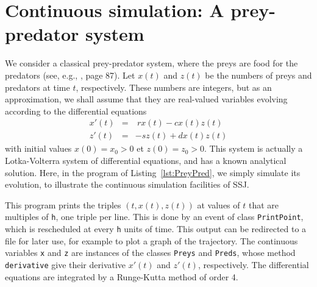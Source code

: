 \section {Continuous simulation: A prey-predator system}
\label {sec:preypred}

We consider a classical prey-predator system, where the preys
are food for the predators (see, e.g., \cite{sLAW00a}, page 87).
Let $x(t)$ and $z(t)$ be the numbers of preys and predators
at time $t$, respectively.
These numbers are integers, but as an approximation,
we shall assume that they are real-valued variables evolving
according to the differential equations
\begin{eqnarray*}
  x'(t) &= &\ r x(t) - c x(t) z(t)\\
  z'(t) &= & -s z(t) + d x(t) z(t)
\end{eqnarray*}
with initial values $x(0)=x_0>0$ et $z(0)=z_0>0$.
This system is actually a Lotka-Volterra system of differential
equations, and has a known analytical solution.
Here, in the program of Listing~\ref{lst:PreyPred},
we simply simulate its evolution, to illustrate the continuous
simulation facilities of SSJ.




This program prints the triples $(t, x(t), z(t))$ at values of
$t$ that are multiples of \texttt{h}, one triple per line.
This is done by an event of class \texttt{PrintPoint}, which is
rescheduled at every \texttt{h} units of time.
This output can be redirected to a file for later use,
for example to plot a graph of the trajectory.
The continuous variables \texttt{x} and \texttt{z} are instances of the
classes \texttt{Preys} and \texttt{Preds}, whose method \texttt{derivative}
give their derivative $x'(t)$ and $z'(t)$, respectively.
The differential equations are integrated by a Runge-Kutta method
of order 4.
